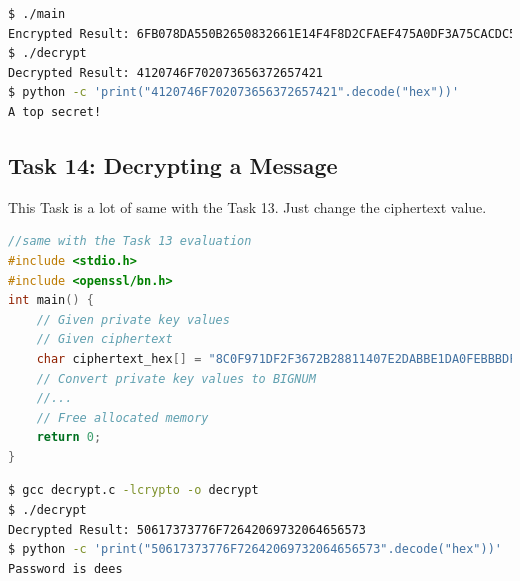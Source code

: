 \documentclass[a4paper,11pt]{article}
\begin{document}
\begin{lstlisting}[caption={Result of the Task 13},label={lst:task4.13-3},language=BASH,breaklines=true]
$ ./main
Encrypted Result: 6FB078DA550B2650832661E14F4F8D2CFAEF475A0DF3A75CACDC5DE5CFC5FADC
$ ./decrypt
Decrypted Result: 4120746F702073656372657421
$ python -c 'print("4120746F702073656372657421".decode("hex"))'
A top secret!
\end{lstlisting} 

\subsection{Task 14: Decrypting a Message}
This Task is a lot of same with the Task 13. Just change the ciphertext value.

\begin{lstlisting}[caption={C Program Code for Decryption},label={lst:task4.14},language=C,breaklines=true]
//same with the Task 13 evaluation
#include <stdio.h>
#include <openssl/bn.h>
int main() {
    // Given private key values
    // Given ciphertext
    char ciphertext_hex[] = "8C0F971DF2F3672B28811407E2DABBE1DA0FEBBBDFC7DCB67396567EA1E2493F";
    // Convert private key values to BIGNUM
    //...
    // Free allocated memory
    return 0;
}
\end{lstlisting} 
\begin{lstlisting}[caption={Result of the Task 14},label={lst:task4.14-2},language=BASH,breaklines=true]
$ gcc decrypt.c -lcrypto -o decrypt
$ ./decrypt
Decrypted Result: 50617373776F72642069732064656573
$ python -c 'print("50617373776F72642069732064656573".decode("hex"))'
Password is dees
\end{lstlisting} 
\end{document}
